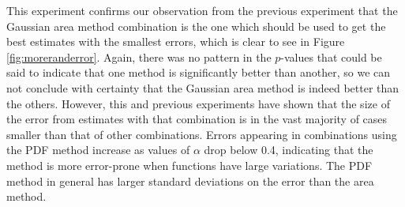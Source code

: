 \documentclass[a4paper,11pt,twoside]{article}
\begin{document}
    This experiment confirms our observation from the previous experiment that the
    Gaussian area method combination is the one which should be used to get the best
    estimates with the smallest errors, which is clear to see in Figure
    \ref{fig:moreranderror}. Again, there was no pattern in the $p$-values that
    could be said to indicate that one method is significantly better than another,
    so we can not conclude with certainty that the Gaussian area method is indeed
    better than the others. However, this and previous experiments have shown that
    the size of the error from estimates with that combination is in the vast
    majority of cases smaller than that of other combinations. Errors appearing in
    combinations using the PDF method increase as values of $\alpha$ drop below 0.4,
    indicating that the method is more error-prone when functions have large
    variations. The PDF method in general has larger standard deviations on the
    error than the area method.
\end{document}
